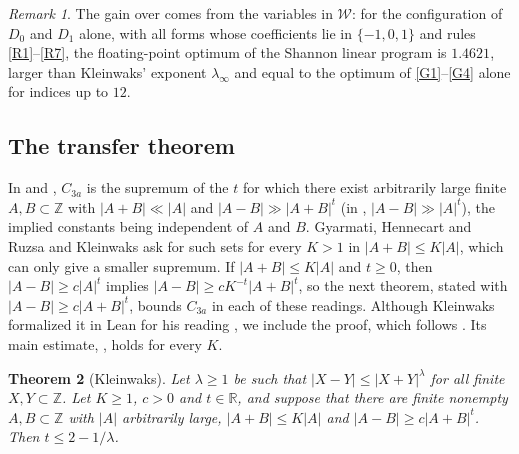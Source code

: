 \documentclass[11pt]{amsart}
\newtheorem{theorem}{Theorem}[section]
\theoremstyle{definition}
\theoremstyle{remark}
\newtheorem{remark}[theorem]{Remark}
\numberwithin{equation}{section}
\newcommand{\R}{\mathbb{R}}
\newcommand{\Z}{\mathbb{Z}}
\begin{document}
\begin{remark}\label{rem:w}
The gain over \cite{Kle26} comes from the variables in $\mathcal W$: for the configuration of $D_0$ and $D_1$ alone, with all forms whose coefficients lie in $\{-1,0,1\}$ and rules \ref{R1}--\ref{R7}, the floating-point optimum of the Shannon linear program is $1.4621$, larger than Kleinwaks' exponent $\lambda_\infty$ and equal to the optimum of \ref{G1}--\ref{G4} alone for indices up to $12$.
\end{remark}

\subsection{The transfer theorem}\label{sec:transfer}
In \cite[page 3a]{TaoC} and \cite[Problem~6.44]{GGTW25}, $C_{3a}$ is the supremum of the $t$ for which there exist arbitrarily large finite $A,B\subset\Z$ with $|A+B|\ll|A|$ and $|A-B|\gg|A+B|^{t}$ (in \cite{GGTW25}, $|A-B|\gg|A|^{t}$), the implied constants being independent of $A$ and $B$. Gyarmati, Hennecart and Ruzsa \cite[(5)]{GHR07} and Kleinwaks \cite[\S2.2]{Kle26} ask for such sets for every $K>1$ in $|A+B|\le K|A|$, which can only give a smaller supremum. If $|A+B|\le K|A|$ and $t\ge0$, then $|A-B|\ge c|A|^t$ implies $|A-B|\ge cK^{-t}|A+B|^t$, so the next theorem, stated with $|A-B|\ge c|A+B|^t$, bounds $C_{3a}$ in each of these readings. Although Kleinwaks formalized it in Lean for his reading \cite{Kle26}, we include the proof, which follows \cite[\S3]{Kle26}. Its main estimate, \cite[Proposition~3.5]{Kle26}, holds for every $K$.

\begin{theorem}[Kleinwaks]\label{thm:transfer}
Let $\lambda\ge1$ be such that $|X-Y|\le|X+Y|^\lambda$ for all finite $X,Y\subset\Z$. Let $K\ge1$, $c>0$ and $t\in\R$, and suppose that there are finite nonempty $A,B\subset\Z$ with $|A|$ arbitrarily large, $|A+B|\le K|A|$ and $|A-B|\ge c|A+B|^{t}$. Then $t\le2-1/\lambda$.
\end{theorem}
\end{document}
